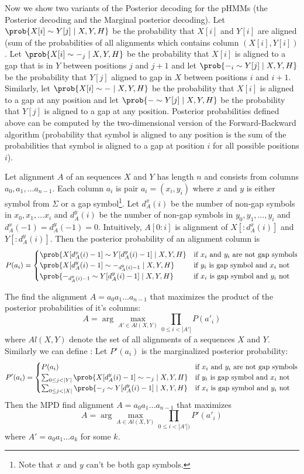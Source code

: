 Now we show two variants of the Posterior decoding for the pHMMs (the Posterior
decoding and the Marginal posterior decoding).  Let $\prob{X[i]\sim Y[j]\mid
X,Y,H}$ be the probability that $X[i]$ and $Y[i]$ are aligned (sum of the
probabilities of all alignments which contains column $(X[i],Y[i])$. Let
$\prob{X[i]\sim -_j\mid X,Y,H}$ be the probability that $X[i]$ is aligned to a
gap that is in $Y$ between positions $j$ and $j+1$ and let $\prob{-_i\sim
Y[j]\mid X,Y,H}$ be the probability that $Y[j]$ aligned to gap in $X$ between
positions $i$ and $i+1$.  Similarly, let $\prob{X[i]\sim - \mid X,Y,H}$ be the
probability that $X[i]$ is aligned to a gap at any position and let $\prob{-\sim
Y[j]\mid X,Y,H}$ be the probability that $Y[j]$ is aligned to a gap at any
position.  Posterior probabilities defined above can be computed by the
two-dimensional version of the Forward-Backward algorithm (probability that
symbol is aligned to any position is the sum of the probabilities that symbol is
aligned to a gap at position $i$ for all possible positions $i$).

Let alignment $A$ of an sequences $X$ and $Y$ has length $n$ and
consists from columns $a_0,a_1,\dots a_{n-1}$. Each column $a_i$ is pair
$a_i=(x_i,y_i)$ where $x$ and $y$ is either symbol from $\Sigma$ or a gap
symbol\footnote{Note that $x$ and $y$ can't be both gap symbols.}.
Let $d_A^x(i)$ be the number of non-gap symbols in $x_0,x_1,\dots x_i$
and $d_A^y(i)$ be the number of non-gap symbols in $y_0,y_1,\dots, y_i$ and
$d_A^x(-1)=d_A^y(-1)=0$. Intuitively, $A[0:i]$ is alignment of $X[:d_A^x(i)]$ 
and $Y[:d_A^y(i)]$. Then the posterior probability of an alignment column is
\[P(a_i)=
\begin{cases}
\prob{X[d_A^x(i)-1]\sim Y[d_A^y(i)-1]\mid X,Y,H} & \text{if $x_i$ and $y_i$ are not gap symbols}\\
\prob{X[d_A^y(i)-1]\sim -_{d_A^y(i)-1}\mid X,Y,H}  & \text{if $y_i$ is gap symbol and $x_i$ not}\\
\prob{-_{d_A^y(i)-1}\sim Y[d_A^y(i)-1]\mid X,Y,H}  & \text{if $x_i$ is gap symbol and $y_i$ not}
\end{cases}
\]

The  find the alignment $A=a_0a_1\dots
a_{n-1}$ that maximizes
the product of the posterior probabilities of it's columns: 
\[A = \arg\max_{A'\in Al(X,Y)}\prod_{0\leq i <
|A'|}P(a'_i)\] where $Al(X,Y)$ denote the set of all  alignments of a sequences
$X$ and $Y$. Similarly we can define : Let $P'(a_i)$ is the marginalized posterior probability:
\[
P'(a_i) = \begin{cases}
P(a_i) & \text{if $x_i$ and $y_i$ are not gap symbols}\\
\sum_{0\leq j < |Y|}\prob{X[d_A^y(i)-1]\sim -_{j}\mid X,Y,H}  & \text{if $y_i$ is gap symbol and $x_i$ not}\\
\sum_{0\leq j < |X|} \prob{-_{j}\sim Y[d_A^y(i)-1]\mid X,Y,H}  & \text{if $x_i$ is gap symbol and $y_i$ not}
\end{cases}
\]
Then the MPD find alignment $A=a_0a_1\dots a_{n-1}$ that maximizes
\[A = \arg\max_{A\in Al(X,Y)}\prod_{0\leq i < |A'|)}P'(a'_i)\] 
where $A'=a_0a_1\dots a_{k}$ for some $k$.

